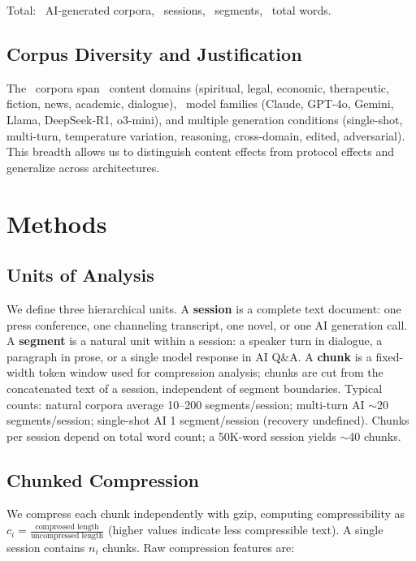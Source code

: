 \documentclass[11pt]{article}
\begin{document}
Total: \nAI\ AI-generated corpora, \nAISessions\ sessions, \nAISegments\ segments, \nAIWords\ total words.

\subsection{Corpus Diversity and Justification}

The \nCorpora\ corpora span \nDomains\ content domains (spiritual, legal, economic, therapeutic, fiction, news, academic, dialogue), \nModels\ model families (Claude, GPT-4o, Gemini, Llama, DeepSeek-R1, o3-mini), and multiple generation conditions (single-shot, multi-turn, temperature variation, reasoning, cross-domain, edited, adversarial). This breadth allows us to distinguish content effects from protocol effects and generalize across architectures.


\section{Methods}

\subsection{Units of Analysis}

We define three hierarchical units. A \textbf{session} is a complete text document: one press conference, one channeling transcript, one novel, or one AI generation call. A \textbf{segment} is a natural unit within a session: a speaker turn in dialogue, a paragraph in prose, or a single model response in AI Q\&A. A \textbf{chunk} is a fixed-width \chunkTokens\-token window used for compression analysis; chunks are cut from the concatenated text of a session, independent of segment boundaries. Typical counts: natural corpora average 10--200 segments/session; multi-turn AI $\sim$20 segments/session; single-shot AI 1 segment/session (recovery undefined). Chunks per session depend on total word count; a 50K-word session yields $\sim$40 chunks.

\subsection{Chunked Compression}

We compress each chunk independently with gzip, computing compressibility as $c_i = \frac{\text{compressed length}}{\text{uncompressed length}}$ (higher values indicate less compressible text). A single session contains $n_i$ chunks. Raw compression features are:
\end{document}
